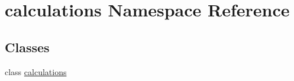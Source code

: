 \hypertarget{namespacecalculations}{}\section{calculations Namespace Reference}
\label{namespacecalculations}
\subsection*{Classes}
\begin{DoxyCompactItemize}
\item 
class \mbox{\hyperlink{classcalculations_1_1calculations}{calculations}}
\end{DoxyCompactItemize}
